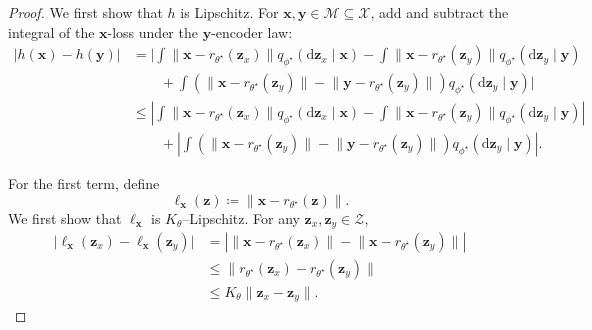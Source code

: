 \documentclass[pdflatex,sn-mathphys-num]{sn-jnl}%
\theoremstyle{thmstyleone}%
\theoremstyle{thmstyletwo}%
\theoremstyle{thmstylethree}%
\begin{document}
\begin{appendices}
\begin{proof}
We first show that $h$ is Lipschitz.  For $\mathbf{x},\mathbf{y}\in\mathcal{M}\subseteq\mathcal{X}$, add and subtract the integral of the $\mathbf{x}$-loss under the $\mathbf{y}$-encoder law:
\begin{align*}
\bigl|h(\mathbf{x})-h(\mathbf{y})\bigr|
&=
\Bigg|
\int
  \bigl\|\mathbf{x}-r_{\theta^\star}(\mathbf{z}_x)\bigr\|
  q_{\phi^\star}
    (\mathrm{d}\mathbf{z}_x\mid\mathbf{x})
-
\int
  \bigl\|\mathbf{x}-r_{\theta^\star}(\mathbf{z}_y)\bigr\|
  q_{\phi^\star}
    (\mathrm{d}\mathbf{z}_y\mid\mathbf{y})
\\
&\qquad
+
\int
  \left(
    \bigl\|\mathbf{x}-r_{\theta^\star}(\mathbf{z}_y)\bigr\|
    -
    \bigl\|\mathbf{y}-r_{\theta^\star}(\mathbf{z}_y)\bigr\|
  \right)
  q_{\phi^\star}
    (\mathrm{d}\mathbf{z}_y\mid\mathbf{y})
\Bigg|
\\
&\leq
\left|
\int
  \bigl\|\mathbf{x}-r_{\theta^\star}(\mathbf{z}_x)\bigr\|
  q_{\phi^\star}
    (\mathrm{d}\mathbf{z}_x\mid\mathbf{x})
-
\int
  \bigl\|\mathbf{x}-r_{\theta^\star}(\mathbf{z}_y)\bigr\|
  q_{\phi^\star}
    (\mathrm{d}\mathbf{z}_y\mid\mathbf{y})
\right|
\\
&\qquad
+
\left|
\int
  \left(
    \bigl\|\mathbf{x}-r_{\theta^\star}(\mathbf{z}_y)\bigr\|
    -
    \bigl\|\mathbf{y}-r_{\theta^\star}(\mathbf{z}_y)\bigr\|
  \right)
  q_{\phi^\star}
    (\mathrm{d}\mathbf{z}_y\mid\mathbf{y})
\right|.
\end{align*}

For the first term, define
\[
  \ell_{\mathbf{x}}(\mathbf{z})
  \coloneqq
  \bigl\|\mathbf{x}-r_{\theta^\star}(\mathbf{z})\bigr\|.
\]
We first show that $\ell_{\mathbf{x}}$ is $K_\theta$--Lipschitz. For any $\mathbf{z}_x,\mathbf{z}_y\in\mathcal{Z}$,
\begin{align*}
\bigl|
  \ell_{\mathbf{x}}(\mathbf{z}_x)
  -
  \ell_{\mathbf{x}}(\mathbf{z}_y)
\bigr|
&=
\left|
  \bigl\|\mathbf{x}-r_{\theta^\star}(\mathbf{z}_x)\bigr\|
  -
  \bigl\|\mathbf{x}-r_{\theta^\star}(\mathbf{z}_y)\bigr\|
\right|
\\
&\leq
\bigl\|
  r_{\theta^\star}(\mathbf{z}_x)
  -
  r_{\theta^\star}(\mathbf{z}_y)
\bigr\|
\\
&\leq
K_\theta\bigl\|\mathbf{z}_x-\mathbf{z}_y\bigr\|.
\end{align*}


\end{proof}
\end{appendices}
\end{document}
